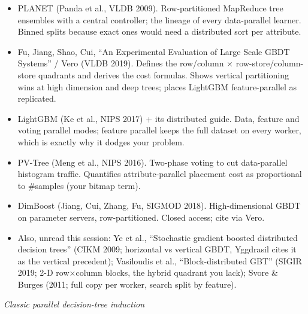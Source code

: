 \documentclass[sigconf,screen]{acmart}
\begin{document}
\begin{itemize}
    \item PLANET (Panda et al., VLDB 2009). Row-partitioned MapReduce tree ensembles with a central controller; the lineage of every data-parallel learner. Binned splits because exact ones would need a distributed sort per attribute.
    \item Fu, Jiang, Shao, Cui, “An Experimental Evaluation of Large Scale GBDT Systems” / Vero (VLDB 2019). Defines the row/column × row-store/column-store quadrants and derives the cost formulas. Shows vertical partitioning wins at high dimension and deep trees; places LightGBM feature-parallel as replicated.
    \item LightGBM (Ke et al., NIPS 2017) + its distributed guide. Data, feature and voting parallel modes; feature parallel keeps the full dataset on every worker, which is exactly why it dodges your problem.
    \item PV-Tree (Meng et al., NIPS 2016). Two-phase voting to cut data-parallel histogram traffic. Quantifies attribute-parallel placement cost as proportional to \#samples (your bitmap term).
    \item DimBoost (Jiang, Cui, Zhang, Fu, SIGMOD 2018). High-dimensional GBDT on parameter servers, row-partitioned. Closed access; cite via Vero.
    \item Also, unread this session: Ye et al., “Stochastic gradient boosted distributed decision trees” (CIKM 2009; horizontal vs vertical GBDT, Yggdrasil cites it as the vertical precedent); Vasiloudis et al., “Block-distributed GBT” (SIGIR 2019; 2-D row×column blocks, the hybrid quadrant you lack); Svore \& Burges (2011; full copy per worker, search split by feature).
\end{itemize}

\textit{Classic parallel decision-tree induction}
\end{document}
